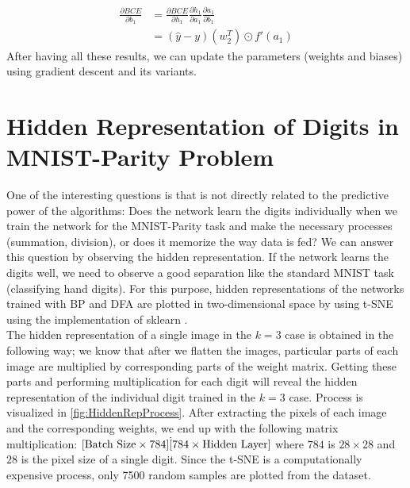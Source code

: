 \documentclass[a4paper, nobind]{templates/ociamthesis}
\begin{document}
\[
\begin{aligned} 
\frac{\partial BCE}{\partial b_{1}}&=\frac{\partial BCE}{\partial h_1} \frac{\partial h_1}{\partial a_{1}} \frac{\partial a_{1}}{\partial b_{1}} \\
&= \left(\hat{y}-y\right)\left(w_{2}^T\right) \odot f'(a_1)
\end{aligned}
\]
After having all these results, we can update the parameters (weights and biases) using gradient descent and its variants.

\hypertarget{hidden-representation-of-digits-in-mnist-parity-problem}{%
\chapter{Hidden Representation of Digits in MNIST-Parity Problem}\label{hidden-representation-of-digits-in-mnist-parity-problem}}

One of the interesting questions is that is not directly related to the predictive power of the algorithms: Does the network learn the digits individually when we train the network for the MNIST-Parity task and make the necessary processes (summation, division), or does it memorize the way data is fed? We can answer this question by observing the hidden representation. If the network learns the digits well, we need to observe a good separation like the standard MNIST task (classifying hand digits). For this purpose, hidden representations of the networks trained with BP and DFA are plotted in two-dimensional space by using t-SNE \cite{vanDerMaaten2008} using the implementation of sklearn \cite{scikit-learn}.\\
The hidden representation of a single image in the \(k=3\) case is obtained in the following way; we know that after we flatten the images, particular parts of each image are multiplied by corresponding parts of the weight matrix. Getting these parts and performing multiplication for each digit will reveal the hidden representation of the individual digit trained in the \(k=3\) case. Process is visualized in \ref{fig:HiddenRepProcess}. After extracting the pixels of each image and the corresponding weights, we end up with the following matrix multiplication: \([\text{Batch Size} \times 784] \dot [784 \space \times \space \text{Hidden Layer}]\) where \(784\) is \(28 \times 28\) and \(28\) is the pixel size of a single digit. Since the t-SNE is a computationally expensive process, only 7500 random samples are plotted from the dataset.
\end{document}
